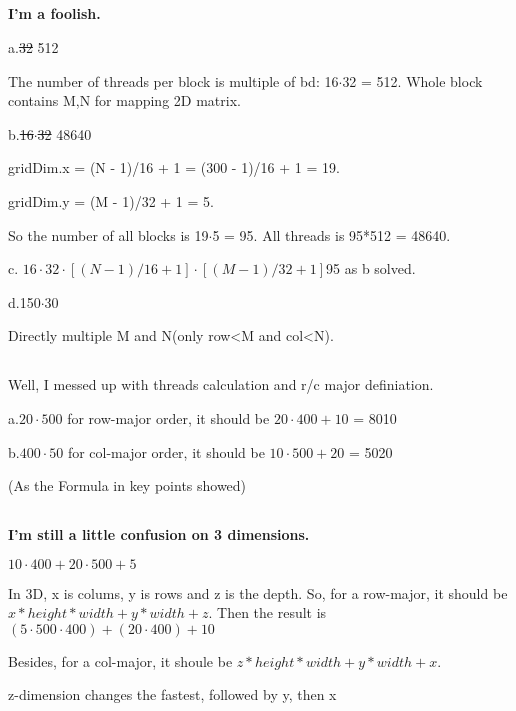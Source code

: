 \documentclass{article}
\begin{document}
\subsection{}
\textbf{I'm a foolish.}

a.\sout{32} 512

The number of threads per block is multiple of bd: 16$\cdot$32 = 512.
Whole block contains M,N for mapping 2D matrix.

b.\sout{16$\cdot$32} 48640

gridDim.x = (N - 1)/16 + 1 = (300 - 1)/16 + 1 = 19.

gridDim.y = (M - 1)/32 + 1 = 5.

So the number of all blocks is 19$\cdot$5 = 95. All threads is 95*512 = 48640.

c. \sout{$16\cdot32\cdot[(N-1)/16+1]\cdot[(M-1)/32+1]$}95 as b solved.

d.150$\cdot$30

Directly multiple M and N(only row<M and col<N).

\subsection{}
Well, I messed up with threads calculation and r/c major definiation.

a.\sout{$20\cdot500$}
for row-major order, it should be \(20\cdot400+10\) = 8010

b.\sout{$400\cdot50$}
for col-major order, it should be \(10\cdot500+20\) = 5020

(As the Formula in key points showed)

\subsection{}
\textbf{I'm still a little confusion on 3 dimensions.}

\sout{\(10\cdot400+20\cdot500+5\)}

In 3D, x is colums, y is rows and z is the depth. So, for a row-major, it should be \(x*height*width+y*width+z\).
Then the result is \((5\cdot500\cdot400)+(20\cdot400)+10\)

Besides, for a col-major, it shoule be \(z*height*width+y*width+x\).

z-dimension changes the fastest, followed by y, then x
\end{document}
